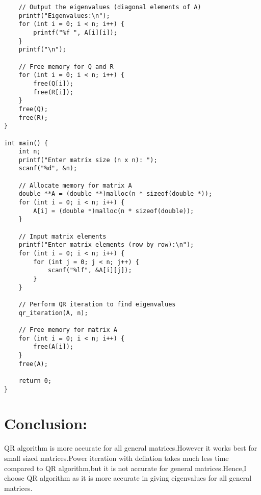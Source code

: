 \documentclass[journal]{IEEEtran}
\begin{document}
\begin{lstlisting}
    // Output the eigenvalues (diagonal elements of A)
    printf("Eigenvalues:\n");
    for (int i = 0; i < n; i++) {
        printf("%f ", A[i][i]);
    }
    printf("\n");

    // Free memory for Q and R
    for (int i = 0; i < n; i++) {
        free(Q[i]);
        free(R[i]);
    }
    free(Q);
    free(R);
}

int main() {
    int n;
    printf("Enter matrix size (n x n): ");
    scanf("%d", &n);

    // Allocate memory for matrix A
    double **A = (double **)malloc(n * sizeof(double *));
    for (int i = 0; i < n; i++) {
        A[i] = (double *)malloc(n * sizeof(double));
    }

    // Input matrix elements
    printf("Enter matrix elements (row by row):\n");
    for (int i = 0; i < n; i++) {
        for (int j = 0; j < n; j++) {
            scanf("%lf", &A[i][j]);
        }
    }

    // Perform QR iteration to find eigenvalues
    qr_iteration(A, n);

    // Free memory for matrix A
    for (int i = 0; i < n; i++) {
        free(A[i]);
    }
    free(A);

    return 0;
}

\end{lstlisting}\vspace{2cm}
\section*{Conclusion:}
QR algorithm is more accurate for all general matrices.However it works best for small sized matrices.Power iteration with deflation takes much less time compared to QR algorithm,but it is not accurate for general matrices.Hence,I choose QR algorithm as it is more accurate in giving eigenvalues for all general matrices.
\end{document}
